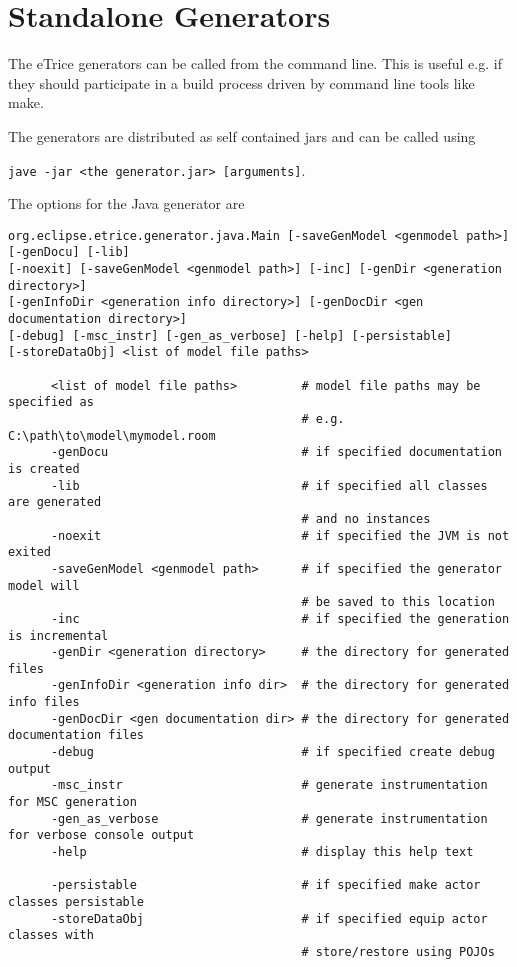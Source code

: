 \chapter{Standalone Generators}

The eTrice generators can be called from the command line.
This is useful e.g. if they should participate in a build
process driven by command line tools like make.

The generators are distributed as self contained jars and
can be called using

\texttt{jave -jar <the generator.jar> [arguments]}.

The options for the Java generator are

\begin{verbatim}
org.eclipse.etrice.generator.java.Main [-saveGenModel <genmodel path>] [-genDocu] [-lib]
[-noexit] [-saveGenModel <genmodel path>] [-inc] [-genDir <generation directory>]
[-genInfoDir <generation info directory>] [-genDocDir <gen documentation directory>]
[-debug] [-msc_instr] [-gen_as_verbose] [-help] [-persistable]
[-storeDataObj] <list of model file paths>

      <list of model file paths>         # model file paths may be specified as
                                         # e.g. C:\path\to\model\mymodel.room
      -genDocu                           # if specified documentation is created
      -lib                               # if specified all classes are generated
                                         # and no instances
      -noexit                            # if specified the JVM is not exited
      -saveGenModel <genmodel path>      # if specified the generator model will
                                         # be saved to this location
      -inc                               # if specified the generation is incremental
      -genDir <generation directory>     # the directory for generated files
      -genInfoDir <generation info dir>  # the directory for generated info files
      -genDocDir <gen documentation dir> # the directory for generated documentation files
      -debug                             # if specified create debug output
      -msc_instr                         # generate instrumentation for MSC generation
      -gen_as_verbose                    # generate instrumentation for verbose console output
      -help                              # display this help text

      -persistable                       # if specified make actor classes persistable
      -storeDataObj                      # if specified equip actor classes with
                                         # store/restore using POJOs
\end{verbatim}

